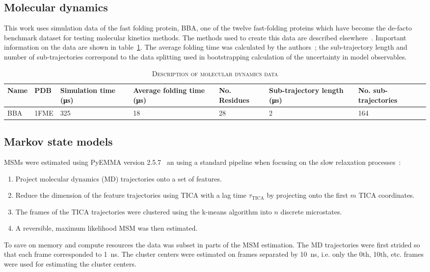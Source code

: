 \documentclass[journal=jacsat,manuscript=article]{achemso}
\begin{document}
\subsection{Molecular dynamics}

This work uses simulation data of the fast folding protein, BBA, one of the twelve fast-folding proteins which have become the de-facto benchmark dataset for testing molecular kinetics methods. The methods used to create this data are described elsewhere~\cite{lindorff-larsen_how_2011}. Important information on the data are shown in table~\ref{tab:data_description}. The average folding time was calculated by the authors~\cite{lindorff-larsen_how_2011}; the sub-trajectory length and number of sub-trajectories correspond to the data splitting used in bootstrapping calculation of the uncertainty in model observables.

\begin{table}
    \caption{\textsc{Description of molecular dynamics data}}
    \begin{tabularx}{\textwidth}{llXXXXX}
    \toprule
    Name & PDB & Simulation time (\si{\micro\second}) & Average folding time (\si{\micro\second}) & No. Residues & Sub-trajectory length (\si{\micro\second}) & No. sub-trajectories \\
    \midrule
    BBA                 & 1FME      & \num{325}     & \num{18}  & 28 & \num{2} & 164 \\
    \bottomrule
    \end{tabularx}
    \label{tab:data_description}
\end{table}

\subsection{Markov state models}
MSMs were estimated using PyEMMA version 2.5.7~\cite{schererPyEMMASoftwarePackage2015a} an using a standard pipeline when focusing on the slow relaxation processes~\cite{noe_markov_2019, husic_markov_2018}: 
\begin{enumerate}
    \item Project molecular dynamics (MD) trajectories onto a set of features. 
    \item Reduce the dimension of the feature trajectories using TICA with a lag time $\tau_{\mathrm{TICA}}$ by projecting onto the first $m$ TICA coordinates. 
    \item The frames of the TICA trajectories were clustered using the k-means algorithm into $n$ discrete microstates. 
    \item A reversible, maximum likelihood MSM was then estimated. 
\end{enumerate}
To save on memory and compute resources  the data was subset in parts of the MSM estimation. The MD trajectories were first strided so that each frame corresponded to \SI{1}{\nano\second}. The cluster centers were estimated on frames separated by \SI{10}{\nano\second}, i.e. only the 0th, 10th, etc. frames were used for estimating the cluster centers. 
\end{document}

